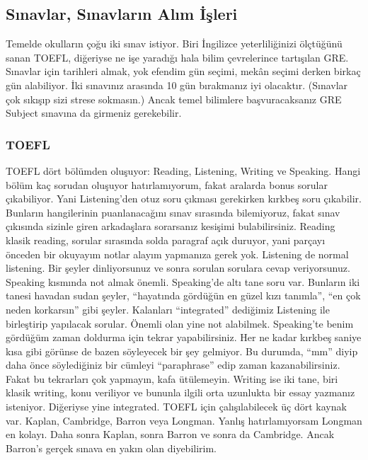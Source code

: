 \documentclass[12pt]{article}
\theoremstyle{break}
\begin{document}
\subsection{Sınavlar, Sınavların Alım İşleri}
Temelde okulların çoğu iki sınav istiyor. Biri İngilizce yeterliliğinizi ölçtüğünü sanan TOEFL, diğeriyse ne işe yaradığı hala bilim çevrelerince tartışılan GRE. Sınavlar için tarihleri almak, yok efendim gün seçimi, mekân seçimi derken birkaç gün alabiliyor. İki sınavınız arasında 10 gün bırakmanız iyi olacaktır. (Sınavlar çok sıkışıp sizi strese sokmasın.) Ancak temel bilimlere başvuracaksanız GRE Subject sınavına da girmeniz gerekebilir.


\subsubsection{TOEFL}
TOEFL dört bölümden oluşuyor: Reading, Listening, Writing ve Speaking. Hangi bölüm kaç sorudan oluşuyor hatırlamıyorum, fakat aralarda bonus sorular çıkabiliyor. Yani Listening’den otuz soru çıkması gerekirken kırkbeş soru çıkabilir. Bunların hangilerinin puanlanacağını sınav sırasında bilemiyoruz, fakat sınav çıkısında sizinle giren arkadaşlara sorarsanız kesişimi bulabilirsiniz. Reading klasik reading, sorular sırasında solda paragraf açık duruyor, yani parçayı önceden bir okuyayım notlar alayım yapmanıza gerek yok. Listening de normal listening. Bir şeyler dinliyorsunuz ve sonra sorulan sorulara cevap veriyorsunuz. Speaking kısmında not almak önemli. Speaking’de altı tane soru var. Bunların iki tanesi havadan sudan şeyler, “hayatında gördüğün en güzel kızı tanımla”, “en çok neden korkarsın” gibi şeyler. Kalanları “integrated” dediğimiz Listening ile birleştirip yapılacak sorular. Önemli olan yine not alabilmek. Speaking’te benim gördüğüm zaman doldurma için tekrar yapabilirsiniz. Her ne kadar kırkbeş saniye kısa gibi görünse de bazen söyleyecek bir şey gelmiyor. Bu durumda, “mm” diyip daha önce söylediğiniz bir cümleyi “paraphrase” edip zaman kazanabilirsiniz. Fakat bu tekrarları çok yapmayın, kafa ütülemeyin. Writing ise iki tane, biri klasik writing, konu veriliyor ve bununla ilgili orta uzunlukta bir essay yazmanız isteniyor. Diğeriyse yine integrated. TOEFL için çalışılabilecek üç dört kaynak var. Kaplan, Cambridge, Barron veya Longman. Yanlış hatırlamıyorsam Longman en kolayı. Daha sonra Kaplan, sonra Barron ve sonra da Cambridge. Ancak Barron’s gerçek sınava en yakın olan diyebilirim.
\end{document}
